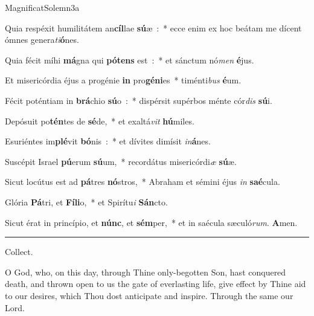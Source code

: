 \documentclass[letterpaper,12pt]{article} %
\begin{document}
{\greblockcustos{}
\begin{magnificat}{MagnificatSolemn3a}
\normalsize
\item \vspace{-3ex}Quia respéxit humilitátem an\textbf{cíl}lae \textbf{sú}æ~:~* ecce enim ex hoc beátam me dícent ómnes genera\emph{ti}\textbf{ó}nes.
\item Quia fécit míhi \textbf{má}gna qui \textbf{pó}\textbf{tens} est~:~* et sánctum nó\emph{men} \textbf{é}jus.
\item Et misericórdia éjus a progénie \textbf{in} pro\textbf{gé}\textbf{ni}es~* timénti\emph{bus} \textbf{é}um.
\item Fécit poténtiam in \textbf{brá}chio \textbf{sú}o~:~* dispérsit supérbos ménte cór\emph{dis} \textbf{sú}i.
\item Depósuit po\textbf{tén}tes de \textbf{sé}de,~* et exaltá\emph{vit} \textbf{hú}miles.
\item Esuriéntes im\textbf{plé}vit \textbf{bó}nis~:~* et dívites dimísit \emph{in}\textbf{á}nes.
\item Suscépit Israel \textbf{pú}erum \textbf{sú}um,~* recordátus misericórdi\emph{æ} \textbf{sú}æ.
\item Sicut locútus est ad \textbf{pá}tres \textbf{nó}stros,~* Abraham et sémini éjus \emph{in} \textbf{saé}cula.
\item Glória \textbf{Pá}tri, et \textbf{Fí}\textbf{li}o,~* et Spirítu\emph{i} \textbf{Sán}cto.
\item Sicut érat in princípio, et \textbf{núnc}, et \textbf{sém}per,~* et in saécula sæculó\emph{rum}. \textbf{A}men.\end{magnificat}
}
\hrule
\smallskip
\begin{center}{\large Collect.}\end{center}
\begin{parcolumns}[rulebetween]{2}
\sloppy
{}
{O God, who, on this day, through Thine only-begotten Son, hast conquered death, and thrown open to us the gate of everlasting life, give effect by Thine aid to our desires, which Thou dost anticipate and inspire. Through the same our Lord.}
\end{parcolumns}
\bigskip


\bigskip
\begin{parcolumns}[rulebetween]{2}
%
%
%
\colplacechunks{}
\end{parcolumns}
\end{document}
